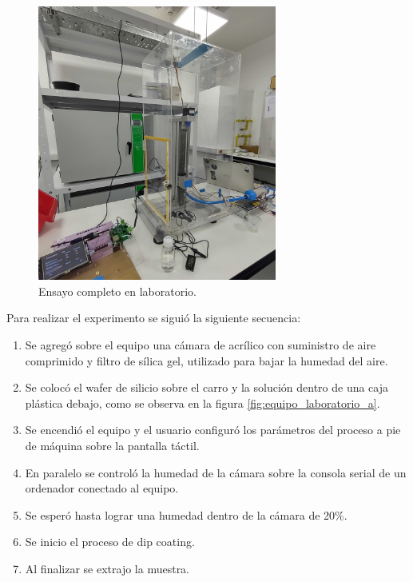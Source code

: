\begin{figure}[h!]
\centering 
\includegraphics[width=0.7\textwidth]{./Figures/prueba_b.jpg}
\caption{Ensayo completo en laboratorio.}
\label{fig:equipo_laboratorio}
\end{figure}


Para realizar el experimento se siguió la siguiente secuencia:
\begin{enumerate}
\item Se agregó sobre el equipo una cámara de acrílico con suministro de aire comprimido y filtro de sílica gel, utilizado para bajar la humedad del aire.
\item Se colocó el wafer de silicio sobre el carro y la solución dentro de una caja plástica debajo, como se observa en la figura \ref{fig:equipo_laboratorio_a}.
\item Se encendió el equipo y el usuario configuró los parámetros del proceso a pie de máquina sobre la pantalla táctil.
\item En paralelo se controló la humedad de la cámara sobre la consola serial de un ordenador conectado al equipo.
\item Se esperó hasta lograr una humedad dentro de la cámara de 20\%.
\item Se inicio el proceso de dip coating.
\item Al finalizar se extrajo la muestra.
\end{enumerate}

